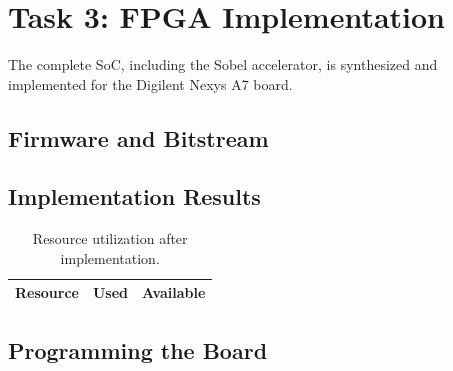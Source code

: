 \section{Task 3: FPGA Implementation} \label{sec:task3}

The complete SoC, including the Sobel accelerator, is synthesized and implemented for the Digilent Nexys A7 board.

\subsection{Firmware and Bitstream}


\subsection{Implementation Results}


\begin{table}[H]
\centering
\caption{Resource utilization after implementation.}
\label{tab:task3_util}
\begin{tabular}{@{}lrr@{}}
\toprule
Resource & Used & Available \\
\midrule
\bottomrule
\end{tabular}
\end{table}

\subsection{Programming the Board}

